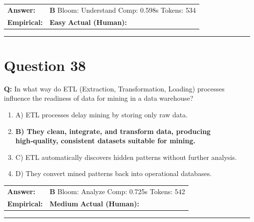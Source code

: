 \documentclass[9pt]{article}
\begin{document}
\begin{tabular}{@{}l p{10.5cm}@{}}
\textbf{Answer:} & \textbf{B} \hspace{1em} Bloom: Understand \hspace{1em} Comp: 0.598s \hspace{1em} Tokens: 534 \\
\textbf{Empirical:} & \textbf{Easy} \hspace{1em} \textbf{Actual (Human):} \underline{\hspace{5cm}}
\end{tabular}

\vspace{0.2cm}
\rule{\textwidth}{0.4pt}
\vspace{0.2cm}


\section*{Question 38}

\textbf{Q:} In what way do ETL (Extraction, Transformation, Loading) processes influence the readiness of data for mining in a data warehouse?

\begin{enumerate}[label=\textbf{\alph{*})}, nosep]
    \item A) ETL processes delay mining by storing only raw data.
    \item \textbf{B) They clean, integrate, and transform data, producing high‑quality, consistent datasets suitable for mining.} %
    \item C) ETL automatically discovers hidden patterns without further analysis.
    \item D) They convert mined patterns back into operational databases.

\end{enumerate}

\begin{tabular}{@{}l p{10.5cm}@{}}
\textbf{Answer:} & \textbf{B} \hspace{1em} Bloom: Analyze \hspace{1em} Comp: 0.725s \hspace{1em} Tokens: 542 \\
\textbf{Empirical:} & \textbf{Medium} \hspace{1em} \textbf{Actual (Human):} \underline{\hspace{5cm}}
\end{tabular}

\vspace{0.2cm}
\rule{\textwidth}{0.4pt}
\vspace{0.2cm}
\end{document}
